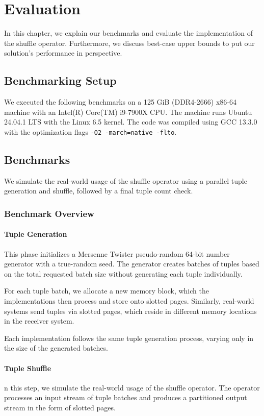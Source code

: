 
\chapter{Evaluation}\label{chapter:evaluation}\acresetall
In this chapter, we explain our benchmarks and evaluate the implementation of the shuffle operator.
Furthermore, we discuss best-case upper bounds to put our solution's performance in perspective.
\section{Benchmarking Setup}\label{section-benchmarking-setup}
We executed the following benchmarks on a 125 GiB (DDR4-2666) x86-64 machine with an Intel(R) Core(TM) i9-7900X CPU.
The machine runs Ubuntu 24.04.1 LTS with the Linux 6.5 kernel.
The code was compiled using GCC 13.3.0 with the optimization flags \texttt{-O2 -march=native -flto}.

\section{Benchmarks}
We simulate the real-world usage of the shuffle operator using a parallel tuple generation and shuffle, followed by a final tuple count check.

\subsection{Benchmark Overview}
\subsubsection{Tuple Generation}
This phase initializes a Mersenne Twister pseudo-random 64-bit number generator with a true-random seed.
The generator creates batches of tuples based on the total requested batch size without generating each tuple individually.

For each tuple batch, we allocate a new memory block, which the implementations then process and store onto slotted pages.
Similarly, real-world systems send tuples via slotted pages, which reside in different memory locations in the receiver system.

Each implementation follows the same tuple generation process, varying only in the size of the generated batches.
\subsubsection{Tuple Shuffle}
n this step, we simulate the real-world usage of the shuffle operator.
The operator processes an input stream of tuple batches and produces a partitioned output stream in the form of slotted pages.

